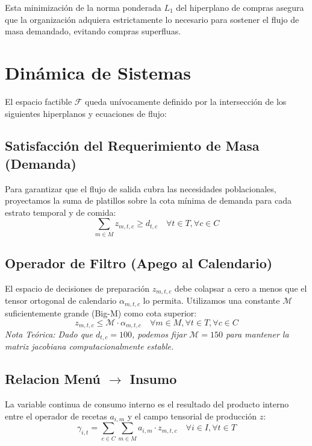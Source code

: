 \documentclass[12pt, a4paper]{article}
\begin{document}
Esta minimización de la norma ponderada $L_1$ del hiperplano de compras asegura que la organización adquiera estrictamente lo necesario para sostener el flujo de masa demandado, evitando compras superfluas.

\section{Dinámica de Sistemas}

El espacio factible $\mathcal{F}$ queda unívocamente definido por la intersección de los siguientes hiperplanos y ecuaciones de flujo:

\subsection{Satisfacción del Requerimiento de Masa (Demanda)}
Para garantizar que el flujo de salida cubra las necesidades poblacionales, proyectamos la suma de platillos sobre la cota mínima de demanda para cada estrato temporal y de comida:
\begin{equation}
    \sum_{m \in M} z_{m,t,c} \ge d_{t,c} \quad \forall t \in T, \forall c \in C
\end{equation}

\subsection{Operador de Filtro (Apego al Calendario)}
El espacio de decisiones de preparación $z_{m,t,c}$ debe colapsar a cero a menos que el tensor ortogonal de calendario $\alpha_{m,t,c}$ lo permita. Utilizamos una constante $\mathcal{M}$ suficientemente grande (Big-M) como cota superior:
\begin{equation}
    z_{m,t,c} \le \mathcal{M} \cdot \alpha_{m,t,c} \quad \forall m \in M, \forall t \in T, \forall c \in C
\end{equation}
\textit{Nota Teórica: Dado que $d_{t,c} = 100$, podemos fijar $\mathcal{M} = 150$ para mantener la matriz jacobiana computacionalmente estable.}

\subsection{Relacion Menú $\to$ Insumo}
La variable continua de consumo interno es el resultado del producto interno entre el operador de recetas $a_{i,m}$ y el campo tensorial de producción $z$:
\begin{equation}
    \gamma_{i,t} = \sum_{c \in C} \sum_{m \in M} a_{i,m} \cdot z_{m,t,c} \quad \forall i \in I, \forall t \in T
\end{equation}
\end{document}
